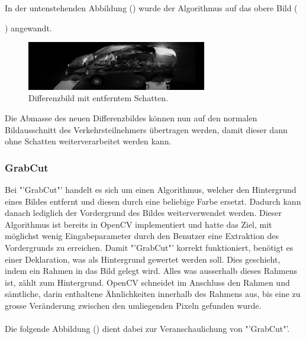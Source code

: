 In der untenstehenden Abbildung () wurde der Algorithmus auf das obere Bild ({) angewandt.

\begin{figure}[H]
  \centering
  \includegraphics[width=0.7\textwidth]{Testversuche/RemoveShadow.jpg} 
  \caption{Differenzbild mit entferntem Schatten.}
  \label{bRemoveShadow}
\end{figure}

Die Abmasse des neuen Differenzbildes können nun auf den normalen Bildausschnitt des Verkehrsteilnehmers übertragen werden, damit dieser dann ohne Schatten weiterverarbeitet werden kann.

\newpage
\subsubsection{GrabCut}
Bei "'GrabCut"' handelt es sich um einen Algorithmus, welcher den Hintergrund eines Bildes entfernt und diesen durch eine beliebige Farbe ersetzt. Dadurch kann danach lediglich der Vordergrund des Bildes weiterverwendet werden. Dieser Algorithmus ist bereits in OpenCV implementiert und hatte das Ziel, mit möglichst wenig Eingabeparameter durch den Benutzer eine Extraktion des Vordergrunds zu erreichen. Damit "'GrabCut"' korrekt funktioniert, benötigt es einer Deklaration, was als Hintergrund gewertet werden soll. Dies geschieht, indem ein Rahmen in das Bild gelegt wird. Alles was ausserhalb dieses Rahmens ist, zählt zum Hintergrund. OpenCV schneidet im Anschluss den Rahmen und sämtliche, darin enthaltene Ähnlichkeiten innerhalb des Rahmens aus, bis eine zu grosse Veränderung zwischen den umliegenden Pixeln gefunden wurde.\\\\
Die folgende Abbildung () dient dabei zur Veranschaulichung von "'GrabCut"'.

}
